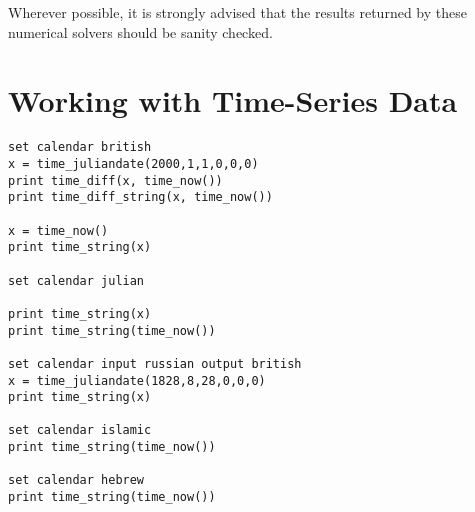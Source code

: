 Wherever possible, it is strongly advised that the results returned by these
numerical solvers should be sanity checked.

\section{Working with Time-Series Data}
\label{sec:time_series}

\begin{verbatim}
set calendar british
x = time_juliandate(2000,1,1,0,0,0)
print time_diff(x, time_now())
print time_diff_string(x, time_now())

x = time_now()
print time_string(x)

set calendar julian

print time_string(x)
print time_string(time_now())

set calendar input russian output british
x = time_juliandate(1828,8,28,0,0,0)
print time_string(x)

set calendar islamic
print time_string(time_now())

set calendar hebrew
print time_string(time_now())
\end{verbatim}
